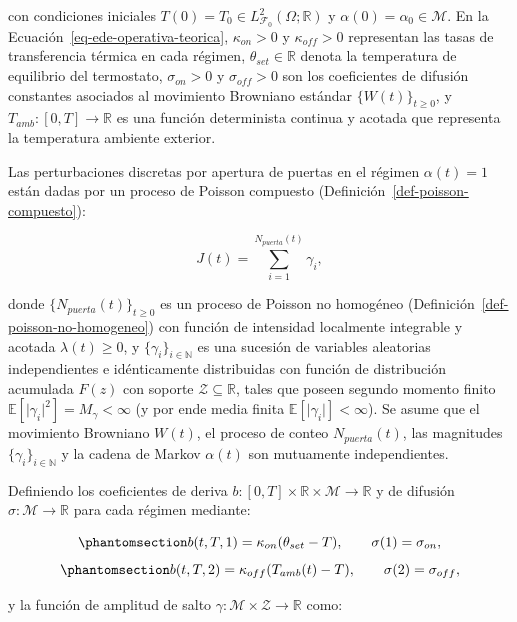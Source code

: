 \documentclass[
  spanish,
  letterpaper,
  DIV=11,
  numbers=noendperiod]{scrreprt}
\theoremstyle{plain}
\theoremstyle{plain}
\theoremstyle{plain}
\theoremstyle{definition}
\theoremstyle{remark}
\begin{document}
con condiciones iniciales
\(T(0) = T_0 \in L^2_{\mathcal{F}_0}(\Omega; \mathbb{R})\) y
\(\alpha(0) = \alpha_0 \in \mathcal{M}\). En la
Ecuación~\ref{eq-ede-operativa-teorica}, \(\kappa_{on} > 0\) y
\(\kappa_{off} > 0\) representan las tasas de transferencia térmica en
cada régimen, \(\theta_{set} \in \mathbb{R}\) denota la temperatura de
equilibrio del termostato, \(\sigma_{on} > 0\) y \(\sigma_{off} > 0\)
son los coeficientes de difusión constantes asociados al movimiento
Browniano estándar \(\{W(t)\}_{t \ge 0}\), y
\(T_{amb}: [0, T] \to \mathbb{R}\) es una función determinista continua
y acotada que representa la temperatura ambiente exterior.

Las perturbaciones discretas por apertura de puertas en el régimen
\(\alpha(t) = 1\) están dadas por un proceso de Poisson compuesto
(Definición~\ref{def-poisson-compuesto}):

\[
J(t) = \sum_{i=1}^{N_{puerta}(t)} \gamma_i,
\]

donde \(\{N_{puerta}(t)\}_{t \ge 0}\) es un proceso de Poisson no
homogéneo (Definición~\ref{def-poisson-no-homogeneo}) con función de
intensidad localmente integrable y acotada \(\lambda(t) \ge 0\), y
\(\{\gamma_i\}_{i \in \mathbb{N}}\) es una sucesión de variables
aleatorias independientes e idénticamente distribuidas con función de
distribución acumulada \(F(z)\) con soporte
\(\mathcal{Z} \subseteq \mathbb{R}\), tales que poseen segundo momento
finito \(\mathbb{E}[\vert \gamma_i \vert^2] = M_\gamma < \infty\) (y por
ende media finita \(\mathbb{E}[\vert \gamma_i \vert] < \infty\)). Se
asume que el movimiento Browniano \(W(t)\), el proceso de conteo
\(N_{puerta}(t)\), las magnitudes \(\{\gamma_i\}_{i \in \mathbb{N}}\) y
la cadena de Markov \(\alpha(t)\) son mutuamente independientes.

Definiendo los coeficientes de deriva
\(b: [0, T] \times \mathbb{R} \times \mathcal{M} \to \mathbb{R}\) y de
difusión \(\sigma: \mathcal{M} \to \mathbb{R}\) para cada régimen
mediante:

\begin{equation}\phantomsection\label{eq-coeficientes-on}{
b(t, T, 1) = \kappa_{on}(\theta_{set} - T), \qquad \sigma(1) = \sigma_{on},
}\end{equation}
\begin{equation}\phantomsection\label{eq-coeficientes-off}{
b(t, T, 2) = \kappa_{off}(T_{amb}(t) - T), \qquad \sigma(2) = \sigma_{off},
}\end{equation}

y la función de amplitud de salto
\(\gamma: \mathcal{M} \times \mathcal{Z} \to \mathbb{R}\) como:
\end{document}
